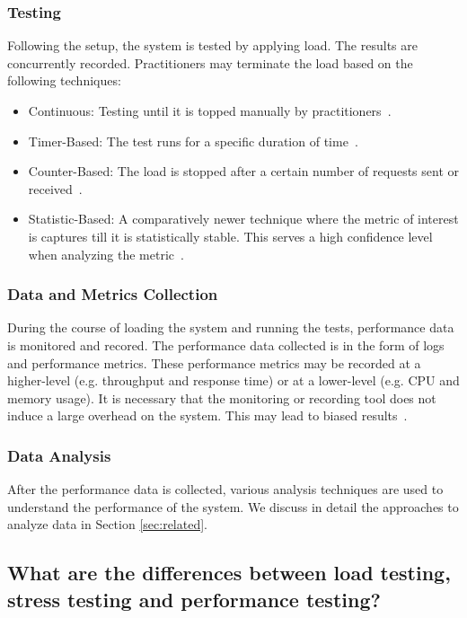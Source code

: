 \subsubsection{Testing}

Following the setup, the system is tested by applying load. The results are concurrently recorded. Practitioners may terminate the load based on the following techniques:

\begin{itemize}
	\item Continuous: Testing until it is topped manually by practitioners~\cite{4017687}.
	\item Timer-Based: The test runs for a specific duration of time~\cite{4017687}.
	\item Counter-Based: The load is stopped after a certain number of requests sent or received~\cite{4017687}.
	\item Statistic-Based: A comparatively newer technique where the metric of interest is captures till it is statistically stable. This serves a high confidence level when analyzing the metric~\cite{mansharamani2010performance,snellman2011towards}.
\end{itemize}

\subsubsection{Data and Metrics Collection}

During the course of loading the system and running the tests, performance data is monitored and recored. The performance data collected is in the form of logs and performance metrics. These performance metrics may be recorded at a higher-level (e.g. throughput and response time) or at a lower-level (e.g. CPU and memory usage). It is necessary that the monitoring or recording tool does not induce a large overhead on the system. This may lead to biased results~\cite{mytkowicz2010evaluating}.

\subsubsection{Data Analysis}
After the performance data is collected, various analysis techniques are used to understand the performance of the system. We discuss in detail the approaches to analyze data in Section \ref{sec:related}.


\subsection{What are the differences between load testing, stress testing and performance testing?}

